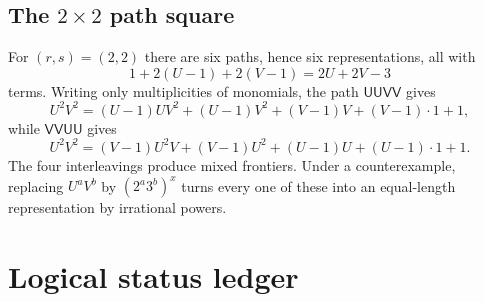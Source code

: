 \documentclass[11pt,oneside]{article}
\theoremstyle{definition}
\begin{document}
\subsection{The \texorpdfstring{$2\times2$}{2-by-2} path square}

For $(r,s)=(2,2)$ there are six paths, hence six representations, all with
\[
       1+2(U-1)+2(V-1)=2U+2V-3
\]
terms.  Writing only multiplicities of monomials, the path
$\mathsf{UUVV}$ gives
\[
  U^2V^2
  =(U-1)UV^2+(U-1)V^2+(V-1)V+(V-1)\cdot1+1,
\]
while $\mathsf{VVUU}$ gives
\[
  U^2V^2
  =(V-1)U^2V+(V-1)U^2+(U-1)U+(U-1)\cdot1+1.
\]
The four interleavings produce mixed frontiers.  Under a counterexample, replacing $U^aV^b$ by $(2^a3^b)^x$ turns every one of these into an equal-length representation by irrational powers.

\section{Logical status ledger}
\end{document}
